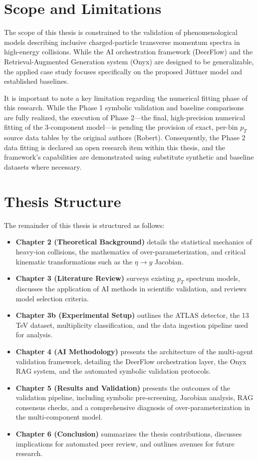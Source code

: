 \section{Scope and Limitations}
The scope of this thesis is constrained to the validation of phenomenological models describing inclusive charged-particle transverse momentum spectra in high-energy collisions. While the AI orchestration framework (DeerFlow) and the Retrieval-Augmented Generation system (Onyx) are designed to be generalizable, the applied case study focuses specifically on the proposed J\"uttner model and established baselines. 

It is important to note a key limitation regarding the numerical fitting phase of this research. While the Phase 1 symbolic validation and baseline comparisons are fully realized, the execution of Phase 2—the final, high-precision numerical fitting of the 3-component model—is pending the provision of exact, per-bin $p_T$ source data tables by the original authors (Robert). Consequently, the Phase 2 data fitting is declared an open research item within this thesis, and the framework's capabilities are demonstrated using substitute synthetic and baseline datasets where necessary.

\section{Thesis Structure}
The remainder of this thesis is structured as follows:
\begin{itemize}
    \item \textbf{Chapter 2 (Theoretical Background)} details the statistical mechanics of heavy-ion collisions, the mathematics of over-parameterization, and critical kinematic transformations such as the $\eta \to y$ Jacobian.
    \item \textbf{Chapter 3 (Literature Review)} surveys existing $p_T$ spectrum models, discusses the application of AI methods in scientific validation, and reviews model selection criteria.
    \item \textbf{Chapter 3b (Experimental Setup)} outlines the ATLAS detector, the 13 TeV dataset, multiplicity classification, and the data ingestion pipeline used for analysis.
    \item \textbf{Chapter 4 (AI Methodology)} presents the architecture of the multi-agent validation framework, detailing the DeerFlow orchestration layer, the Onyx RAG system, and the automated symbolic validation protocols.
    \item \textbf{Chapter 5 (Results and Validation)} presents the outcomes of the validation pipeline, including symbolic pre-screening, Jacobian analysis, RAG consensus checks, and a comprehensive diagnosis of over-parameterization in the multi-component model.
    \item \textbf{Chapter 6 (Conclusion)} summarizes the thesis contributions, discusses implications for automated peer review, and outlines avenues for future research.
\end{itemize}
